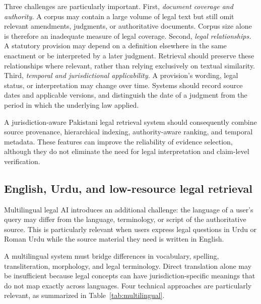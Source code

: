 Three challenges are particularly important. First, \textit{document coverage and authority.} A corpus
may contain a large volume of legal text but still omit relevant amendments, judgments, or authoritative
documents. Corpus size alone is therefore an inadequate measure of legal coverage. Second, \textit{legal
relationships.} A statutory provision may depend on a definition elsewhere in the same enactment or be
interpreted by a later judgment. Retrieval should preserve these relationships where relevant, rather
than relying exclusively on textual similarity. Third, \textit{temporal and jurisdictional
applicability.} A provision's wording, legal status, or interpretation may change over time. Systems
should record source dates and applicable versions, and distinguish the date of a judgment from the
period in which the underlying law applied.

A jurisdiction-aware Pakistani legal retrieval system should consequently combine source provenance,
hierarchical indexing, authority-aware ranking, and temporal metadata. These features can improve the
reliability of evidence selection, although they do not eliminate the need for legal interpretation and
claim-level verification.

\subsection{English, Urdu, and low-resource legal retrieval}

Multilingual legal AI introduces an additional challenge: the language of a user's query may differ from
the language, terminology, or script of the authoritative source. This is particularly relevant when
users express legal questions in Urdu or Roman Urdu while the source material they need is written in
English.

A multilingual system must bridge differences in vocabulary, spelling, transliteration, morphology, and
legal terminology. Direct translation alone may be insufficient because legal concepts can have
jurisdiction-specific meanings that do not map exactly across languages. Four technical approaches are
particularly relevant, as summarized in Table~\ref{tab:multilingual}.

